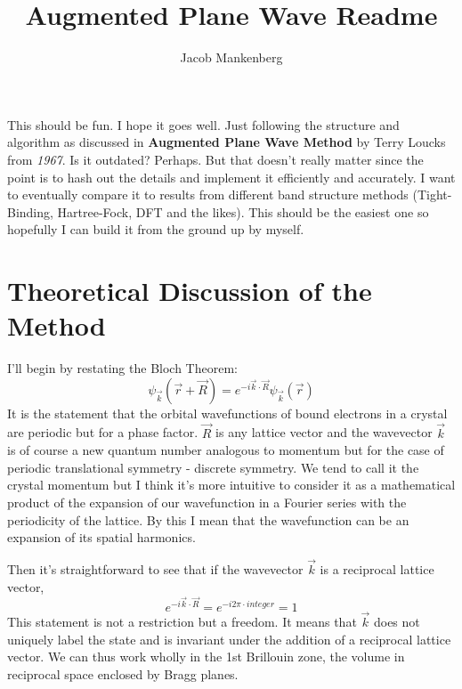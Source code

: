 \documentclass[11pt]{article}
\numberwithin{equation}{section}
\begin{document}
\title{Augmented Plane Wave Readme}
\author{Jacob Mankenberg}
\maketitle



This should be fun. I hope it goes well. Just following the structure and algorithm as discussed in \textbf{Augmented Plane Wave Method} by Terry Loucks from \textit{1967}. Is it outdated? Perhaps. But that doesn't really matter since the point is to hash out the details and implement it efficiently and accurately. I want to eventually compare it to results from different band structure methods (Tight-Binding, Hartree-Fock, DFT and the likes). This should be the easiest one so hopefully I can build it from the ground up by myself.

\section{Theoretical Discussion of the Method}
I'll begin by restating the Bloch Theorem:
\begin{equation}
\psi_{\vec{k}}(\vec{r} + \vec{R}) = e^{-i \vec{k}\cdot\vec{R}} \psi_{\vec{k}}(\vec{r})
\end{equation}
It is the statement that the orbital wavefunctions of bound electrons in a crystal are periodic but for a phase factor. $\vec{R}$ is any lattice vector and the wavevector $\vec{k}$ is of course a new quantum number analogous to momentum but for the case of periodic translational symmetry - discrete symmetry. We tend to call it the crystal momentum but I think it's more intuitive to consider it as a mathematical product of the expansion of our wavefunction in a Fourier series with the periodicity of the lattice. By this I mean that the wavefunction can be an expansion of its spatial harmonics.

Then it's straightforward to see that if the wavevector $\vec{k}$ is a reciprocal lattice vector,
\begin{equation}
e^{-i\vec{k}\cdot\vec{R}} = e^{-i2\pi\cdot integer} = 1
\end{equation}
This statement is not a restriction but a freedom. It means that $\vec{k}$ does not uniquely label the state and is invariant under the addition of a reciprocal lattice vector. We can thus work wholly in the 1st Brillouin zone, the volume in reciprocal space enclosed by Bragg planes.
\end{document}
